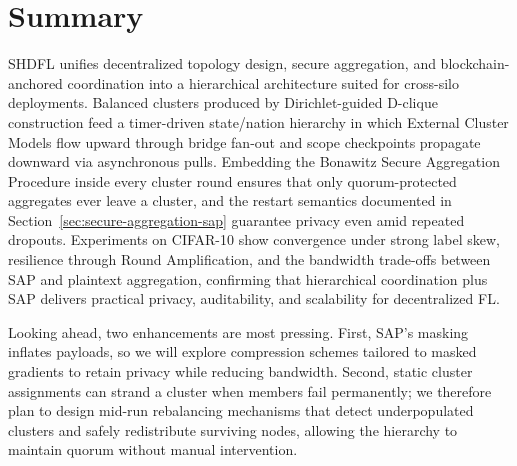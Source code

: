 \section{Summary}
\label{sec:summary}

SHDFL unifies decentralized topology design, secure aggregation, and blockchain-anchored coordination into a hierarchical architecture suited for cross-silo deployments. Balanced clusters produced by Dirichlet-guided D-clique construction feed a timer-driven state/nation hierarchy in which External Cluster Models flow upward through bridge fan-out and scope checkpoints propagate downward via asynchronous pulls. Embedding the Bonawitz Secure Aggregation Procedure inside every cluster round ensures that only quorum-protected aggregates ever leave a cluster, and the restart semantics documented in Section~\ref{sec:secure-aggregation-sap} guarantee privacy even amid repeated dropouts. Experiments on CIFAR-10 show convergence under strong label skew, resilience through Round Amplification, and the bandwidth trade-offs between SAP and plaintext aggregation, confirming that hierarchical coordination plus SAP delivers practical privacy, auditability, and scalability for decentralized FL.

Looking ahead, two enhancements are most pressing. First, SAP’s masking inflates payloads, so we will explore compression schemes tailored to masked gradients to retain privacy while reducing bandwidth. Second, static cluster assignments can strand a cluster when members fail permanently; we therefore plan to design mid-run rebalancing mechanisms that detect underpopulated clusters and safely redistribute surviving nodes, allowing the hierarchy to maintain quorum without manual intervention.
